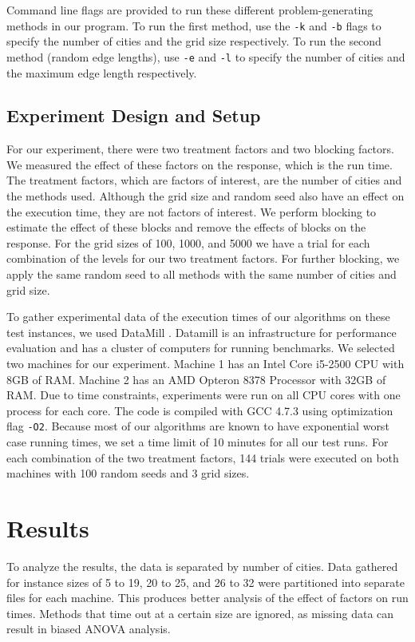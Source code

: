 \documentclass[11pt]{article}
\begin{document}
	Command line flags are provided to run these different problem-generating methods in our program. To run the first method, use the \texttt{-k} and \texttt{-b} flags to specify the number of cities and the grid size respectively. To run the second method (random edge lengths), use \texttt{-e} and \texttt{-l} to specify the number of cities and the maximum edge length respectively.
	
	\subsection{Experiment Design and Setup}
	For our experiment, there were two treatment factors and two blocking factors. We measured the effect of these factors on the response, which is the run time. The treatment factors, which are factors of interest, are the number of cities and the methods used. Although the grid size and random seed also have an effect on the execution time, they are not factors of interest. We perform blocking to estimate the effect of these blocks and remove  the effects of blocks on the response. For the grid sizes of 100, 1000, and 5000 we have a trial for each combination of the levels for our two treatment factors. For further blocking, we apply the same random seed to all methods with the same number of cities and grid size. 
	
	To gather experimental data of the execution times of our algorithms on these test instances, we used DataMill \cite{Datamill}. Datamill is an infrastructure for performance evaluation and has a cluster of computers for running benchmarks. We selected two machines for our experiment. Machine 1 has an Intel Core i5-2500 CPU with 8GB of RAM. Machine 2 has an AMD Opteron 8378 Processor with 32GB of RAM. Due to time constraints, experiments were run on all CPU cores with one process for each core. The code is compiled with GCC 4.7.3 using optimization flag \texttt{-O2}. Because most of our algorithms are known to have exponential worst case running times, we set a time limit of 10 minutes for all our test runs. For each combination of the two treatment factors, 144 trials were executed on both machines with 100 random seeds and 3 grid sizes. 
	
	\section{Results}
	To analyze the results, the data is separated by number of cities. Data gathered for instance sizes of 5 to 19, 20 to 25, and 26 to 32 were partitioned into separate files for each machine. This  produces better analysis of the effect of factors on run times. Methods that time out at a certain size are ignored, as missing data can result in biased ANOVA analysis. 
	
\end{document}
